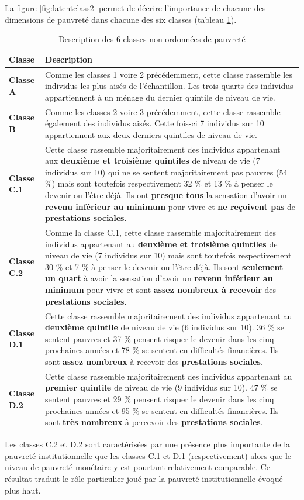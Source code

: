 \documentclass[12pt,a4paper]{reedthesis}
\begin{document}
La figure \ref{fig:latentclass2} permet de décrire l'importance de chacune des dimensions de pauvreté dans chacune des six classes (tableau \ref{tab:tabclassesA}).
\begin{longtable}[t]{>{}l>{\raggedright\arraybackslash}p{11cm}}
\caption{\label{tab:tabclassesA}Description des 6 classes non ordonnées de pauvreté}\\
\toprule
Classe & Description\\
\midrule
\textbf{Classe A} & Comme les classes 1 voire 2 précédemment, cette classe rassemble les individus les plus aisés de l’échantillon. Les trois quarts des individus appartiennent à un ménage du dernier quintile de niveau de vie.\\
\textbf{Classe B} & Comme les classes 2 voire 3 précédemment, cette classe rassemble également des individus aisés. Cette fois-ci 7 individus sur 10 appartiennent aux deux derniers quintiles de niveau de vie.\\
\textbf{Classe C.1} & Cette classe rassemble majoritairement des individus appartenant aux \textbf{deuxième et troisième quintiles} de niveau de vie (7 individus sur 10) qui ne se sentent majoritairement pas pauvres (54 \%) mais sont toutefois respectivement 32 \% et 13 \% à penser le devenir ou l’être déjà. Ils ont \textbf{presque tous} la sensation d’avoir un \textbf{revenu inférieur au minimum} pour vivre et \textbf{ne reçoivent pas} de \textbf{prestations sociales}.\\
\textbf{Classe C.2} & Comme la classe C.1, cette classe rassemble majoritairement des individus appartenant au \textbf{deuxième et troisième quintiles} de niveau de vie (7 individus sur 10) mais sont toutefois respectivement 30 \% et 7 \% à penser le devenir ou l’être déjà. Ils sont \textbf{seulement un quart} à avoir la sensation d’avoir un \textbf{revenu inférieur au minimum} pour vivre et sont \textbf{assez nombreux à recevoir} des \textbf{prestations sociales}.\\
\textbf{Classe D.1} & Cette classe rassemble majoritairement des individus appartenant au \textbf{deuxième quintile} de niveau de vie (6 individus sur 10). 36 \% se sentent pauvres et 37 \% pensent risquer le devenir dans les cinq prochaines années et 78 \% se sentent en difficultés financières. Ils sont \textbf{assez nombreux} à recevoir des \textbf{prestations sociales}.\\
\addlinespace
\textbf{Classe D.2} & Cette classe rassemble majoritairement des individus appartenant au \textbf{premier quintile} de niveau de vie (9 individus sur 10). 47 \% se sentent pauvres et 29 \% pensent risquer le devenir dans les cinq prochaines années et 95 \% se sentent en difficultés financières. Ils sont \textbf{très nombreux} à percevoir des \textbf{prestations sociales}.\\
\bottomrule
\end{longtable}
Les classes C.2 et D.2 sont caractérisées par une présence plus importante de la pauvreté institutionnelle que les classes C.1 et D.1 (respectivement) alors que le niveau de pauvreté monétaire y est pourtant relativement comparable. Ce résultat traduit le rôle particulier joué par la pauvreté institutionnelle évoqué plus haut.
\end{document}
